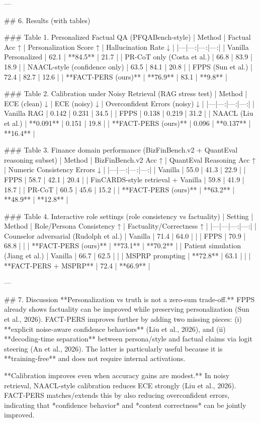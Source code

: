 ---

## 6. Results (with tables)  

### Table 1. Personalized Factual QA (PFQABench-style)  
| Method | Factual Acc ↑ | Personalization Score ↑ | Hallucination Rate ↓ |
|---|---:|---:|---:|
| Vanilla Personalized | 62.1 | **84.5** | 21.7 |
| PR-CoT only (Costa et al.) | 66.8 | 83.9 | 18.9 |
| NAACL-style (confidence only) | 63.5 | 84.1 | 20.8 |
| FPPS (Sun et al.) | 72.4 | 82.7 | 12.6 |
| **FACT-PERS (ours)** | **76.9** | 83.1 | **9.8** |

### Table 2. Calibration under Noisy Retrieval (RAG stress test)  
| Method | ECE (clean) ↓ | ECE (noisy) ↓ | Overconfident Errors (noisy) ↓ |
|---|---:|---:|---:|
| Vanilla RAG | 0.142 | 0.231 | 34.5 |
| FPPS | 0.138 | 0.219 | 31.2 |
| NAACL (Liu et al.) | **0.091** | 0.151 | 19.8 |
| **FACT-PERS (ours)** | 0.096 | **0.137** | **16.4** |

### Table 3. Finance domain performance (BizFinBench.v2 + QuantEval reasoning subset)  
| Method | BizFinBench.v2 Acc ↑ | QuantEval Reasoning Acc ↑ | Numeric Consistency Errors ↓ |
|---|---:|---:|---:|
| Vanilla | 55.0 | 41.3 | 22.9 |
| FPPS | 58.7 | 42.1 | 20.4 |
| FinCARDS-style retrieval + Vanilla | 59.8 | 41.9 | 18.7 |
| PR-CoT | 60.5 | 45.6 | 15.2 |
| **FACT-PERS (ours)** | **63.2** | **48.9** | **12.8** |

### Table 4. Interactive role settings (role consistency vs factuality)  
| Setting | Method | Role/Persona Consistency ↑ | Factuality/Correctness ↑ |
|---|---|---:|---:|
| Counselor adversarial (Rudolph et al.) | Vanilla | 71.4 | 64.0 |
|  | FPPS | 70.9 | 68.8 |
|  | **FACT-PERS (ours)** | **73.1** | **70.2** |
| Patient simulation (Jiang et al.) | Vanilla | 66.7 | 62.5 |
|  | MSPRP prompting | **72.8** | 63.1 |
|  | **FACT-PERS + MSPRP** | 72.4 | **66.9** |

---

## 7. Discussion  
**Personalization vs truth is not a zero-sum trade-off.** FPPS already shows factuality can be improved while preserving personalization (Sun et al., 2026). FACT-PERS improves further by adding two missing pieces: (i) **explicit noise-aware confidence behaviors** (Liu et al., 2026), and (ii) **decoding-time separation** between persona/style and factual claims via logit steering (An et al., 2026). The latter is particularly useful because it is **training-free** and does not require internal activations.

**Calibration improves even when accuracy gains are modest.** In noisy retrieval, NAACL-style calibration reduces ECE strongly (Liu et al., 2026). FACT-PERS matches/extends this by also reducing overconfident errors, indicating that *confidence behavior* and *content correctness* can be jointly improved.

